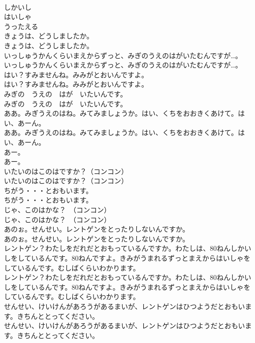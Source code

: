 \documentclass[8pt]{extreport}
\begin{document}
\begin{CJK}{UTF8}{min}
\\	しかいし
\\	はいしゃ
\\	うったえる
\\	きょうは、どうしましたか。	
\\	きょうは、どうしましたか。 
\\	いっしゅうかんくらいまえからずっと、みぎのうえのはがいたむんですが…。	
\\	いっしゅうかんくらいまえからずっと、みぎのうえのはがいたむんですが…。 
\\	はい？すみませんね。みみがとおいんですよ。	
\\	はい？すみませんね。みみがとおいんですよ。 
\\	みぎの　うえの　はが　いたいんです。	
\\	みぎの　うえの　はが　いたいんです。 
\\	ああ。みぎうえのはね。みてみましょうか。はい、くちをおおきくあけて。はい、あーん。	
\\	ああ。みぎうえのはね。みてみましょうか。はい、くちをおおきくあけて。はい、あーん。 
\\	あー。	
\\	あー。 
\\	いたいのはこのはですか？（コンコン）	
\\	いたいのはこのはですか？（コンコン） 
\\	ちがう・・・とおもいます。	
\\	ちがう・・・とおもいます。 
\\	じゃ、このはかな？　（コンコン）	
\\	じゃ、このはかな？　（コンコン） 
\\	あのぉ。せんせい。レントゲンをとったりしないんですか。	
\\	あのぉ。せんせい。レントゲンをとったりしないんですか。 
\\	レントゲン？わたしをだれだとおもっているんですか。わたしは、80ねんしかいしをしているんです。80ねんですよ。きみがうまれるずっとまえからはいしゃをしているんです。むしばくらいわかります。	
\\	レントゲン？わたしをだれだとおもっているんですか。わたしは、80ねんしかいしをしているんです。80ねんですよ。きみがうまれるずっとまえからはいしゃをしているんです。むしばくらいわかります。 
\\	せんせい、けいけんがあろうがあるまいが、レントゲンはひつようだとおもいます。きちんととってください。	
\\	せんせい、けいけんがあろうがあるまいが、レントゲンはひつようだとおもいます。きちんととってください。 

\end{CJK}
\end{document}
